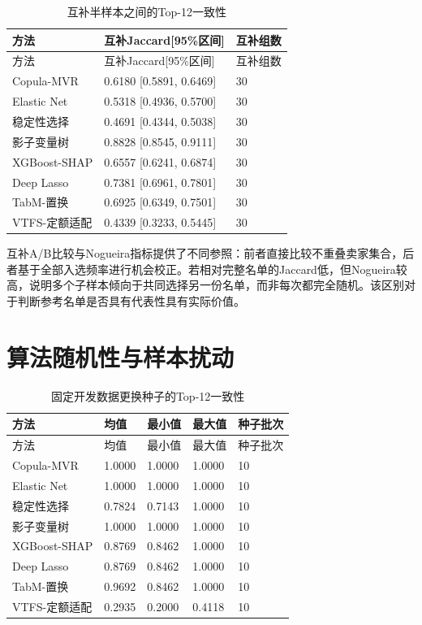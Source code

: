 \documentclass{sufethesismas}
\begin{document}
{
\footnotesize
\begin{longtable}[]{@{}lll@{}}
\caption{互补半样本之间的Top-12一致性}\tabularnewline
\toprule\noalign{}
方法 & 互补Jaccard{[}95\%区间{]} & 互补组数 \\
\midrule\noalign{}
\endfirsthead
\toprule\noalign{}
方法 & 互补Jaccard{[}95\%区间{]} & 互补组数 \\
\midrule\noalign{}
\endhead
\bottomrule\noalign{}
\endlastfoot
Copula-MVR & 0.6180 {[}0.5891, 0.6469{]} & 30 \\
Elastic Net & 0.5318 {[}0.4936, 0.5700{]} & 30 \\
稳定性选择 & 0.4691 {[}0.4344, 0.5038{]} & 30 \\
影子变量树 & 0.8828 {[}0.8545, 0.9111{]} & 30 \\
XGBoost-SHAP & 0.6557 {[}0.6241, 0.6874{]} & 30 \\
Deep Lasso & 0.7381 {[}0.6961, 0.7801{]} & 30 \\
TabM-置换 & 0.6925 {[}0.6349, 0.7501{]} & 30 \\
VTFS-定额适配 & 0.4339 {[}0.3233, 0.5445{]} & 30 \\
\end{longtable}
}

互补A/B比较与Nogueira指标提供了不同参照：前者直接比较不重叠卖家集合，后者基于全部入选频率进行机会校正。若相对完整名单的Jaccard低，但Nogueira较高，说明多个子样本倾向于共同选择另一份名单，而非每次都完全随机。该区别对于判断参考名单是否具有代表性具有实际价值。

\section{算法随机性与样本扰动}

{
\footnotesize
\begin{longtable}[]{@{}lllll@{}}
\caption{固定开发数据更换种子的Top-12一致性}\tabularnewline
\toprule\noalign{}
方法 & 均值 & 最小值 & 最大值 & 种子批次 \\
\midrule\noalign{}
\endfirsthead
\toprule\noalign{}
方法 & 均值 & 最小值 & 最大值 & 种子批次 \\
\midrule\noalign{}
\endhead
\bottomrule\noalign{}
\endlastfoot
Copula-MVR & 1.0000 & 1.0000 & 1.0000 & 10 \\
Elastic Net & 1.0000 & 1.0000 & 1.0000 & 10 \\
稳定性选择 & 0.7824 & 0.7143 & 1.0000 & 10 \\
影子变量树 & 1.0000 & 1.0000 & 1.0000 & 10 \\
XGBoost-SHAP & 0.8769 & 0.8462 & 1.0000 & 10 \\
Deep Lasso & 0.8769 & 0.8462 & 1.0000 & 10 \\
TabM-置换 & 0.9692 & 0.8462 & 1.0000 & 10 \\
VTFS-定额适配 & 0.2935 & 0.2000 & 0.4118 & 10 \\
\end{longtable}
}
\end{document}
